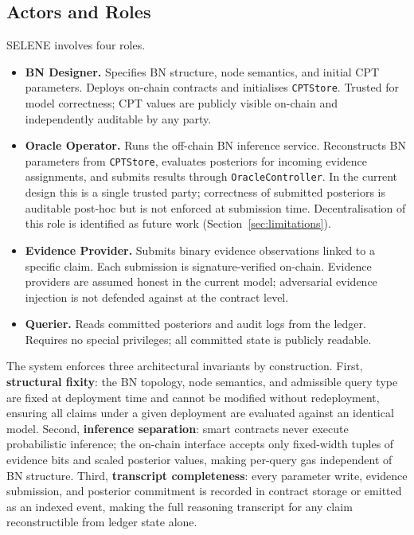 \documentclass[journal]{IEEEtran}
\begin{document}
\subsection{Actors and Roles}

SELENE involves four roles.

\begin{itemize}

  \item \textbf{BN Designer.}
  Specifies BN structure, node semantics, and initial
  CPT parameters. Deploys on-chain contracts and
  initialises \texttt{CPTStore}. Trusted for model
  correctness; CPT values are publicly visible on-chain
  and independently auditable by any party.

  \item \textbf{Oracle Operator.}
  Runs the off-chain BN inference service. Reconstructs
  BN parameters from \texttt{CPTStore}, evaluates
  posteriors for incoming evidence assignments, and
  submits results through \texttt{OracleController}.
  In the current design this is a single trusted party;
  correctness of submitted posteriors is auditable
  post-hoc but is not enforced at submission time.
  Decentralisation of this role is identified as future
  work (Section~\ref{sec:limitations}).

  \item \textbf{Evidence Provider.}
  Submits binary evidence observations linked to a
  specific claim. Each submission is
  signature-verified on-chain. Evidence providers are
  assumed honest in the current model; adversarial
  evidence injection is not defended against at the
  contract level.

  \item \textbf{Querier.}
  Reads committed posteriors and audit logs from the
  ledger. Requires no special privileges; all committed
  state is publicly readable.

\end{itemize}

The system enforces three architectural invariants by
construction. First, \textbf{structural fixity}: the BN
topology, node semantics, and admissible query type are
fixed at deployment time and cannot be modified without
redeployment, ensuring all claims under a given
deployment are evaluated against an identical model.
Second, \textbf{inference separation}: smart contracts
never execute probabilistic inference; the on-chain
interface accepts only fixed-width tuples of evidence
bits and scaled posterior values, making per-query gas
independent of BN structure.
Third, \textbf{transcript completeness}: every parameter
write, evidence submission, and posterior commitment is
recorded in contract storage or emitted as an indexed
event, making the full reasoning transcript for any
claim reconstructible from ledger state alone.
\end{document}

